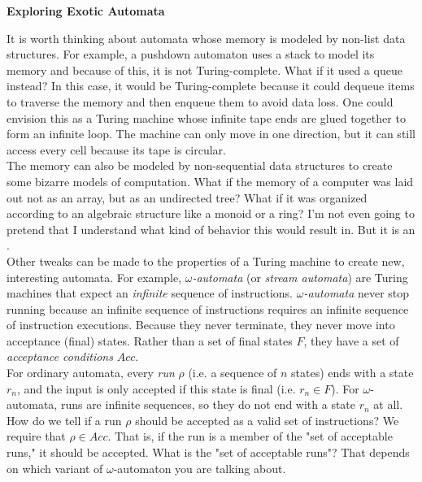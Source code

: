 \begin{tcolorbox}[breakable, enhanced, colback=textbook-blue, sharp corners]
	
	\vspace{3mm}
	
	\begin{center}
		\textbf{Exploring Exotic Automata}
	\end{center}

	It is worth thinking about automata whose memory is modeled by non-list data structures. For example, a pushdown automaton uses a stack to model its memory and because of this, it is not Turing-complete. What if it used a queue instead? In this case, it would be Turing-complete because it could dequeue items to traverse the memory and then enqueue them to avoid data loss. One could envision this as a Turing machine whose infinite tape ends are glued together to form an infinite loop. The machine can only move in one direction, but it can still access every cell because its tape is circular. \\
	
	The memory can also be modeled by non-sequential data structures to create some bizarre models of computation. What if the memory of a computer was laid out not as an array, but as an undirected tree? What if it was organized according to an algebraic structure like a monoid or a ring? I'm not even going to pretend that I understand what kind of behavior this would result in. But it is an . \\
	
	Other tweaks can be made to the properties of a Turing machine to create new, interesting automata. For example, \textit{$\omega$-automata} (or \textit{stream automata}) are Turing machines that expect an \textit{infinite} sequence of instructions. \textit{$\omega$-automata} never stop running because an infinite sequence of instructions requires an infinite sequence of instruction executions. Because they never terminate, they never move into acceptance (final) states. Rather than a set of final states $F$, they have a set of \textit{acceptance conditions} $Acc$. \\
	
	For ordinary automata, every \textit{run} $\rho$ (i.e. a sequence of $n$ states) ends with a state $r_n$, and the input is only accepted if this state is final (i.e. $r_n\in F$). For $\omega$-automata, runs are infinite sequences, so they do not end with a state $r_n$ at all. How do we tell if a run $\rho$ should be accepted as a valid set of instructions? We require that $\rho\in Acc$. That is, if the run is a member of the "set of acceptable runs," it should be accepted. What is the "set of acceptable runs"? That depends on which variant of $\omega$-automaton you are talking about. \\
	

\end{tcolorbox}
